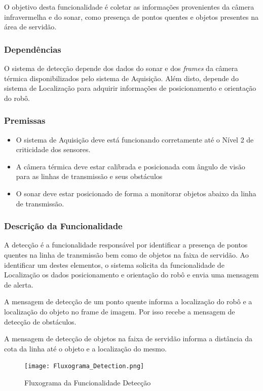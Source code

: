 O objetivo desta funcionalidade é coletar as informações provenientes da câmera infravermelha e do sonar, como presença de pontos quentes e objetos presentes na área de servidão. 

\subsubsection{Dependências}
O sistema de detecção depende dos dados do sonar e dos \textit{frames} da câmera térmica disponibilizados pelo sistema de Aquisição. Além disto, depende do sistema de Localização para adquirir informações de posicionamento e orientação do robô.

\subsubsection{Premissas}
\begin{itemize}
	\item O sistema de Aquisição deve está funcionando corretamente até o Nível 2 de criticidade dos sensores.
	\item A câmera térmica deve estar calibrada e posicionada com ângulo de visão para as linhas de transmissão e seus obstáculos
	\item O sonar deve estar posicionado de forma a monitorar objetos abaixo da linha de transmissão.            
\end{itemize}

\subsubsection{Descrição da Funcionalidade}

A detecção é a funcionalidade responsável por identificar a presença de pontos quentes na linha de transmissão bem como de objetos na faixa de servidão. Ao identificar um destes elementos, o sistema solicita da funcionalidade de Localização os dados posicionamento e orientação do robô e envia uma mensagem de alerta.

A mensagem de detecção de um ponto quente informa a localização do robô e a localização do objeto no frame de imagem. Por isso recebe a mensagem de detecção de obstáculos. 

A mensagem de detecção de objetos na faixa de servidão informa a distância da cota da linha até o objeto e a localização do mesmo. 

\begin{figure}[!ht]
	\centering
	\texttt{[image: Fluxograma\_Detection.png]}
	\caption{Fluxograma da Funcionalidade Detecção} \label{FuncDetec}
\end{figure}

